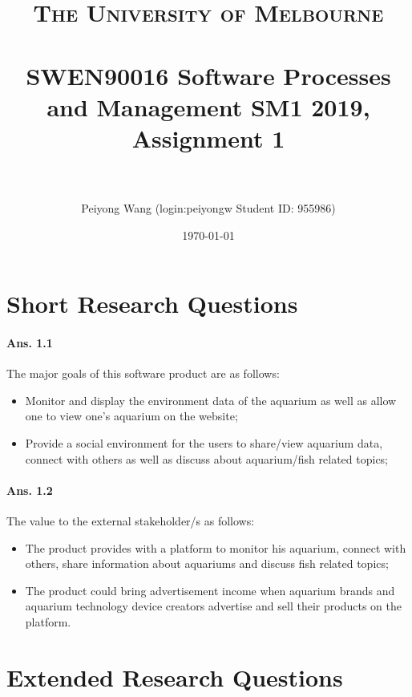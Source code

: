 \documentclass[paper=a4, fontsize=11pt]{scrartcl} %
\title{	
\normalfont \normalsize 
\textsc{The University of Melbourne } \\ [25pt] %
\horrule{0.5pt} \\[0.4cm] %
\huge SWEN90016 Software Processes and Management SM1 2019,
Assignment 1 \\ %
\horrule{2pt} \\[0.5cm] %
}
\author{Peiyong Wang   (login:peiyongw \; Student ID: 955986)} %
\date{\normalsize\today} %
\numberwithin{equation}{section} %
\numberwithin{figure}{section} %
\numberwithin{table}{section} %
\begin{document}
\maketitle %


\section{Short Research Questions}

\paragraph{Ans. 1.1}

The major goals of this software product are as follows:

\begin{itemize}
	\item Monitor and display the environment data of the aquarium as well as allow one to view one's aquarium on the website;
	\item Provide a social environment for the users to share/view aquarium data, connect with others as well as discuss about aquarium/fish related topics;
\end{itemize}

\paragraph{Ans. 1.2}
The value to the external stakeholder/s as follows:
\begin{itemize}
	\item The product provides with a platform to monitor his aquarium, connect with others, share information about aquariums and discuss fish related topics;
	\item The product could bring advertisement income when aquarium brands and aquarium technology device creators advertise and sell their products on the platform\cite{case}. 
\end{itemize}




\section{Extended Research Questions}
\end{document}
